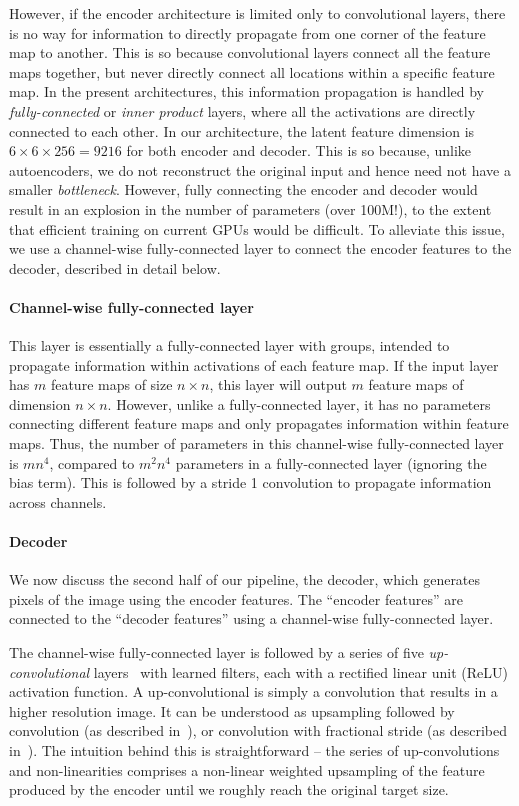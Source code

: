 \documentclass[10pt,twocolumn,letterpaper]{article}
\begin{document}
However, if the encoder architecture is limited only to convolutional layers, there is no way for information to directly propagate from one corner of the feature map to another.
This is so because convolutional layers connect all the feature maps together, but never directly connect all locations within a specific feature map.
In the present architectures, this information propagation is handled by \textit{fully-connected} or \textit{inner product} layers, where all the activations are directly connected to each other.
%
In our architecture, the latent feature dimension is $6\times 6 \times 256 = 9216$ for both encoder and decoder.
This is so because, unlike autoencoders, we do not reconstruct the original input and hence need not have a smaller \textit{bottleneck}.
However, fully connecting the encoder and decoder would result in an explosion in the number of parameters (over 100M!), to the extent that efficient training on current GPUs would be difficult.
To alleviate this issue, we use a channel-wise fully-connected layer to connect the encoder features to the decoder, described in detail below.

\paragraph{Channel-wise fully-connected layer}
This layer is essentially a fully-connected layer with groups, intended to propagate information within activations of each feature map.
If the input layer has $m$ feature maps of size $n\times n$, this layer will output $m$ feature maps of dimension $n\times n$.
However, unlike a fully-connected layer, it has no parameters connecting different feature maps and only propagates information within feature maps.
Thus, the number of parameters in this channel-wise fully-connected layer is $mn^4$, compared to $m^2n^4$ parameters in a fully-connected layer (ignoring the bias term).
This is followed by a stride 1 convolution to propagate information across channels.

\paragraph{Decoder}
We now discuss the second half of our pipeline, the decoder, which generates pixels of the image using the encoder features.
The ``encoder features'' are connected to the ``decoder features'' using a channel-wise fully-connected layer.

The channel-wise fully-connected layer is followed by a series of five \textit{up-convolutional} layers~\cite{ZeilerF14,chairs,long2014fully} with learned filters, each with a rectified linear unit (ReLU) activation function.
A up-convolutional is simply a convolution that results in a higher resolution image.
It can be understood as upsampling followed by convolution (as described in~\cite{chairs}), or convolution with fractional stride (as described in~\cite{long2014fully}).
The intuition behind this is straightforward -- the series of up-convolutions and non-linearities comprises a non-linear weighted upsampling of the feature produced by the encoder until we roughly reach the original target size.
%
\end{document}
